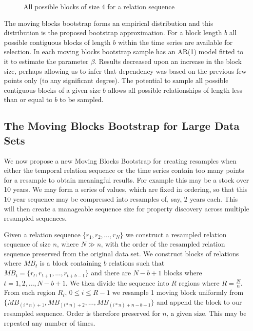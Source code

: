 \smallskip

\begin{figure}[ht]
\centerline{}
\caption{\label{fig:mbb} All possible blocks of size 4 for a relation sequence}
\end{figure}

The moving blocks bootstrap forms an empirical distribution and this
distribution is the proposed bootstrap approximation. For a block
length $b$ all possible contiguous blocks of length $b$ within the
time series are available for selection. In \cite{et93} each moving
blocks bootstrap sample has an AR(1) model fitted to it to estimate
the parameter $\beta$. Results decreased upon an increase in the block
size, perhaps allowing us to infer that dependency was based on the
previous few points only (to any significant degree). The potential to
sample all possible contiguous blocks of a given size $b$ allows all
possible relationships of length less than or equal to $b$ to be sampled.


\subsection{The Moving Blocks Bootstrap for Large Data Sets}\label{subsec:tr_vlmbb}


We now propose a new Moving Blocks Bootstrap for creating resamples
when either the temporal relation sequence or the time series contain
too many points for a resample to obtain meaningful results. For
example this may be a stock over 10 years. We may form a series of
values, which are fixed in ordering, so that this 10 year sequence may
be compressed into resamples of, say, 2 years each. This will then create a
manageable sequence size for property discovery across multiple
resampled sequences.

\begin{definition}\label{def:vlmbb}
\begin{rm}
Given a relation sequence $\{ r_1, r_2, \ldots, r_N \}$ we construct a
resampled relation sequence of size $n$, where $N \gg n$, with the
order of the resampled relation sequence preserved from the original
data set.
We construct blocks of relations where $MB_t$ is a block containing
$b$ relations such that $MB_t = \{ r_t, r_{t+1}, \ldots, r_{t+b-1} \}$
and there are $N - b+ 1$ blocks where $t = 1, 2, \ldots, N-b+1$. 
We then divide the sequence into $R$ regions where $R = \frac{N}{n}$.
From each region $R_i$, $0 \le i \le R-1$ we resample 1 moving block
uniformly from $\{ MB_{(i*n)+1}, MB_{(i*n)+2}, \ldots,
MB_{(i*n)+n-b+1} \}$ and append 
the block to our resampled sequence. Order is therefore preserved for
$n$, a given 
size. This may be repeated any number of times. 
\end{rm}
\end{definition}

